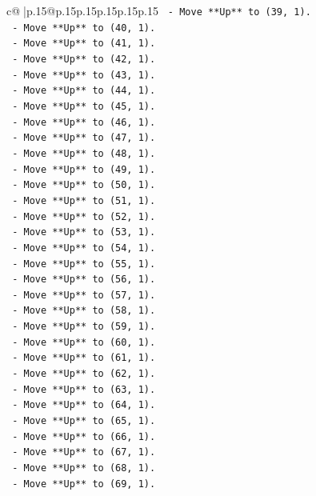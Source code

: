 \documentclass{article}
\begin{document}
{\begin{supertabular}{c@{$\;$}|p{.15\linewidth}@{}p{.15\linewidth}p{.15\linewidth}p{.15\linewidth}p{.15\linewidth}p{.15\linewidth}}
{{{\texttt{    {-} Move **Up** to (39, 1).} \\
\texttt{    {-} Move **Up** to (40, 1).} \\
\texttt{    {-} Move **Up** to (41, 1).} \\
\texttt{    {-} Move **Up** to (42, 1).} \\
\texttt{    {-} Move **Up** to (43, 1).} \\
\texttt{    {-} Move **Up** to (44, 1).} \\
\texttt{    {-} Move **Up** to (45, 1).} \\
\texttt{    {-} Move **Up** to (46, 1).} \\
\texttt{    {-} Move **Up** to (47, 1).} \\
\texttt{    {-} Move **Up** to (48, 1).} \\
\texttt{    {-} Move **Up** to (49, 1).} \\
\texttt{    {-} Move **Up** to (50, 1).} \\
\texttt{    {-} Move **Up** to (51, 1).} \\
\texttt{    {-} Move **Up** to (52, 1).} \\
\texttt{    {-} Move **Up** to (53, 1).} \\
\texttt{    {-} Move **Up** to (54, 1).} \\
\texttt{    {-} Move **Up** to (55, 1).} \\
\texttt{    {-} Move **Up** to (56, 1).} \\
\texttt{    {-} Move **Up** to (57, 1).} \\
\texttt{    {-} Move **Up** to (58, 1).} \\
\texttt{    {-} Move **Up** to (59, 1).} \\
\texttt{    {-} Move **Up** to (60, 1).} \\
\texttt{    {-} Move **Up** to (61, 1).} \\
\texttt{    {-} Move **Up** to (62, 1).} \\
\texttt{    {-} Move **Up** to (63, 1).} \\
\texttt{    {-} Move **Up** to (64, 1).} \\
\texttt{    {-} Move **Up** to (65, 1).} \\
\texttt{    {-} Move **Up** to (66, 1).} \\
\texttt{    {-} Move **Up** to (67, 1).} \\
\texttt{    {-} Move **Up** to (68, 1).} \\
\texttt{    {-} Move **Up** to (69, 1).} \\
}}}
\end{supertabular}}
\end{document}
